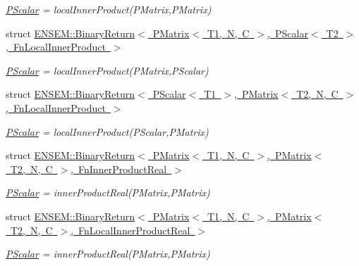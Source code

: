 \begin{DoxyCompactItemize}
\begin{DoxyCompactList}\small\item\em \mbox{\hyperlink{classENSEM_1_1PScalar}{P\+Scalar}} = local\+Inner\+Product(\+P\+Matrix,\+P\+Matrix) \end{DoxyCompactList}\item 
struct \mbox{\hyperlink{structENSEM_1_1BinaryReturn_3_01PMatrix_3_01T1_00_01N_00_01C_01_4_00_01PScalar_3_01T2_01_4_00_01FnLocalInnerProduct_01_4}{E\+N\+S\+E\+M\+::\+Binary\+Return$<$ P\+Matrix$<$ T1, N, C $>$, P\+Scalar$<$ T2 $>$, Fn\+Local\+Inner\+Product $>$}}
\begin{DoxyCompactList}\small\item\em \mbox{\hyperlink{classENSEM_1_1PScalar}{P\+Scalar}} = local\+Inner\+Product(\+P\+Matrix,\+P\+Scalar) \end{DoxyCompactList}\item 
struct \mbox{\hyperlink{structENSEM_1_1BinaryReturn_3_01PScalar_3_01T1_01_4_00_01PMatrix_3_01T2_00_01N_00_01C_01_4_00_01FnLocalInnerProduct_01_4}{E\+N\+S\+E\+M\+::\+Binary\+Return$<$ P\+Scalar$<$ T1 $>$, P\+Matrix$<$ T2, N, C $>$, Fn\+Local\+Inner\+Product $>$}}
\begin{DoxyCompactList}\small\item\em \mbox{\hyperlink{classENSEM_1_1PScalar}{P\+Scalar}} = local\+Inner\+Product(\+P\+Scalar,\+P\+Matrix) \end{DoxyCompactList}\item 
struct \mbox{\hyperlink{structENSEM_1_1BinaryReturn_3_01PMatrix_3_01T1_00_01N_00_01C_01_4_00_01PMatrix_3_01T2_00_01N_00_b7141a669b31fb2094aee5e58df04a01}{E\+N\+S\+E\+M\+::\+Binary\+Return$<$ P\+Matrix$<$ T1, N, C $>$, P\+Matrix$<$ T2, N, C $>$, Fn\+Inner\+Product\+Real $>$}}
\begin{DoxyCompactList}\small\item\em \mbox{\hyperlink{classENSEM_1_1PScalar}{P\+Scalar}} = inner\+Product\+Real(\+P\+Matrix,\+P\+Matrix) \end{DoxyCompactList}\item 
struct \mbox{\hyperlink{structENSEM_1_1BinaryReturn_3_01PMatrix_3_01T1_00_01N_00_01C_01_4_00_01PMatrix_3_01T2_00_01N_00_c0701524dc0f1159f2f6c12312f494be}{E\+N\+S\+E\+M\+::\+Binary\+Return$<$ P\+Matrix$<$ T1, N, C $>$, P\+Matrix$<$ T2, N, C $>$, Fn\+Local\+Inner\+Product\+Real $>$}}
\begin{DoxyCompactList}\small\item\em \mbox{\hyperlink{classENSEM_1_1PScalar}{P\+Scalar}} = inner\+Product\+Real(\+P\+Matrix,\+P\+Matrix) \end{DoxyCompactList}\item 

\end{DoxyCompactItemize}
